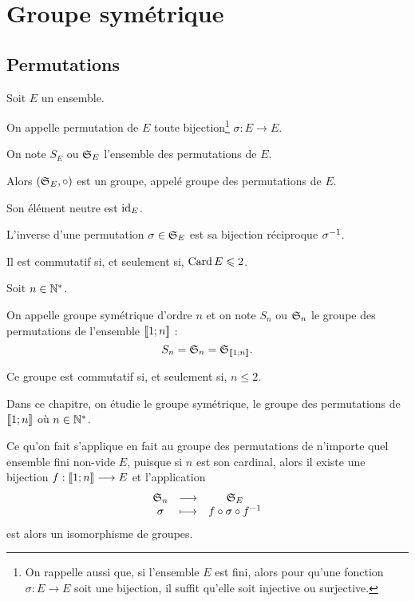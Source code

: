 \chapter{Groupe symétrique}

\minitoc

\section{Permutations}

\begin{rappel}
Soit \(E\) un ensemble.

On appelle permutation de \(E\) toute bijection\footnote{On rappelle aussi que, si l'ensemble \(E\) est fini, alors pour qu'une fonction \(\sigma:E\to E\) soit une bijection, il suffit qu'elle soit injective ou surjective.} \(\sigma:E\to E\).

On note \(S_E\) ou \(\S{E}\) l'ensemble des permutations de \(E\).

Alors \(\groupe{\S{E}}[\rond]\) est un groupe, appelé groupe des permutations de \(E\).

Son élément neutre est \(\id{E}\).

L'inverse d'une permutation \(\sigma\in\S{E}\) est sa bijection réciproque \(\sigma\inv\).

Il est commutatif si, et seulement si, \(\Card E\leq2\).
\end{rappel}

\begin{defi}
Soit \(n\in\Ns\).

On appelle groupe symétrique d'ordre \(n\) et on note \(S_n\) ou \(\S{n}\) le groupe des permutations de l'ensemble \(\interventierii{1}{n}\) : \[S_n=\S{n}=\S{\interventierii{1}{n}}.\]

Ce groupe est commutatif si, et seulement si, \(n\leq2\).
\end{defi}

\begin{rem}
Dans ce chapitre, on étudie le groupe symétrique, \cad le groupe des permutations de \(\interventierii{1}{n}\) où \(n\in\Ns\).

Ce qu'on fait s'applique en fait au groupe des permutations de n'importe quel ensemble fini non-vide \(E\), puisque si \(n\) est son cardinal, alors il existe une bijection \(f:\interventierii{1}{n}\to E\) et l'application \[\fonctionlambda{\S{n}}{\S{E}}{\sigma}{f\rond\sigma\rond f\inv}\] est alors un isomorphisme de groupes.
\end{rem}

